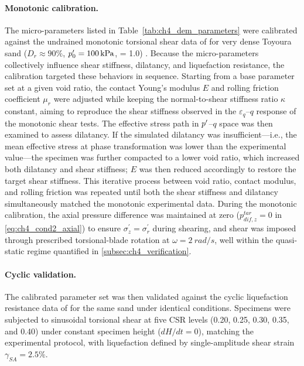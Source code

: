 \documentclass[../main]{subfiles}
\begin{document}
\paragraph{Monotonic calibration.}
The micro-parameters listed in Table~\ref{tab:ch4_dem_parameters} were calibrated against the undrained monotonic torsional shear data of \citet{Nakata1998} for very dense Toyoura sand ($D_r \approx 90\%$, $p'_0=\SI{100}{kPa}$, \Kzero{} = 1.0) \citep[see also][]{Ma2024}. Because the micro-parameters collectively influence shear stiffness, dilatancy, and liquefaction resistance, the calibration targeted these behaviors in sequence. Starting from a base parameter set at a given void ratio, the contact Young's modulus $E$ and rolling friction coefficient $\mu_r$ were adjusted while keeping the normal-to-shear stiffness ratio $\kappa$ constant, aiming to reproduce the shear stiffness observed in the $\varepsilon_q$--$q$ response of the monotonic shear tests. The effective stress path in $p'$--$q$ space was then examined to assess dilatancy. If the simulated dilatancy was insufficient---i.e., the mean effective stress at phase transformation was lower than the experimental value---the specimen was further compacted to a lower void ratio, which increased both dilatancy and shear stiffness; $E$ was then reduced accordingly to restore the target shear stiffness. This iterative process between void ratio, contact modulus, and rolling friction was repeated until both the shear stiffness and dilatancy simultaneously matched the monotonic experimental data. During the monotonic calibration, the axial pressure difference was maintained at zero ($p_{dif,z}^{tar}=0$ in \cref{eq:ch4_cond2_axial}) to ensure $\sigma_z^{\prime}=\sigma_r^{\prime}$ during shearing, and shear was imposed through prescribed torsional-blade rotation at $\omega = \SI{2}{rad/s}$, well within the quasi-static regime quantified in \cref{subsec:ch4_verification}.

\paragraph{Cyclic validation.}
The calibrated parameter set was then validated against the cyclic liquefaction resistance data of \citet{Ishihara1985} for the same sand under identical conditions. Specimens were subjected to sinusoidal torsional shear at five CSR levels (0.20, 0.25, 0.30, 0.35, and 0.40) under constant specimen height ($dH/dt=0$), matching the experimental protocol, with liquefaction defined by single-amplitude shear strain $\gamma_{SA}=2.5\%$.
\end{document}
